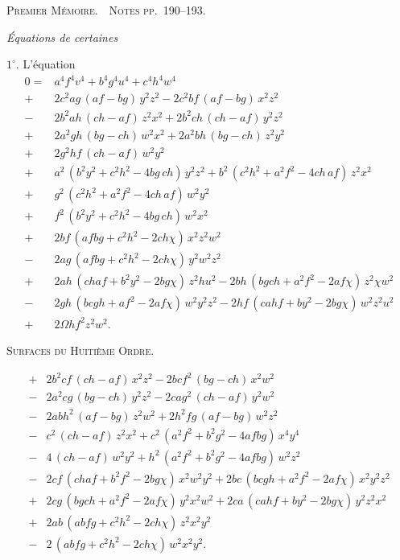 \documentclass[11pt,a4paper]{article}
\theoremstyle{plain}
\theoremstyle{definition}
\begin{document}
\begin{center}
\textsc{Premier M\'emoire.\ \ Notes pp.~190--193.}
\end{center}

\medskip\noindent
\textit{\'Equations de certaines}
\medskip

$1^\circ$.  L'\'equation
\begin{align*}
0 = {}& a^4 f^4 v^4 + b^4 g^4 u^4 + c^4 h^4 w^4 \\
{}+{}& 2c^2 ag\,(af - bg)\,y^2 z^2 - 2c^2 bf\,(af - bg)\,x^2 z^2 \\
{}-{}& 2b^2 ah\,(ch - af)\,z^2 x^2 + 2b^2 ch\,(ch - af)\,y^2 z^2 \\
{}+{}& 2a^2 gh\,(bg - ch)\,w^2 x^2 + 2a^2 bh\,(bg - ch)\,z^2 y^2 \\
{}+{}& 2g^2 hf\,(ch - af)\,w^2 y^2 \\
{}+{}& a^2\,(b^2 y^2 + c^2 h^2 - 4bg\,ch)\,y^2 z^2
       + b^2\,(c^2 h^2 + a^2 f^2 - 4ch\,af)\,z^2 x^2 \\
{}+{}& g^2\,(c^2 h^2 + a^2 f^2 - 4ch\,af)\,w^2 y^2 \\
{}+{}& f^2\,(b^2 y^2 + c^2 h^2 - 4bg\,ch)\,w^2 x^2 \\
{}+{}& 2bf\,(af bg + c^2 h^2 - 2ch\chi)\,x^2 z^2 w^2 \\
{}-{}& 2ag\,(af bg + c^2 h^2 - 2ch\chi)\,y^2 w^2 z^2 \\
{}+{}& 2ah\,(ch af + b^2 y^2 - 2bg\chi)\,z^2 h u^2
       - 2bh\,(bg ch + a^2 f^2 - 2af\chi)\,z^2 \chi w^2 \\
{}-{}& 2gh\,(bc gh + af^2 - 2af\chi)\,w^2 y^2 z^2
       - 2hf\,(c a hf + b y^2 - 2bg\chi)\,w^2 z^2 u^2 \\
{}+{}& 2\Omega h f^2 z^2 w^2.
\end{align*}

\medskip\noindent
\textsc{Surfaces du Huiti\`eme Ordre.}
\medskip

\begin{align*}
{}+{}& 2b^2 cf\,(ch - af)\,x^2 z^2 - 2bc f^2\,(bg - ch)\,x^2 w^2 \\
{}-{}& 2a^2 cg\,(bg - ch)\,y^2 z^2 - 2c a g^2\,(ch - af)\,y^2 w^2 \\
{}-{}& 2abh^2\,(af - bg)\,z^2 w^2 + 2h^2 f g\,(af - bg)\,w^2 z^2 \\
{}-{}& c^2\,(ch - af)\,z^2 x^2 + c^2\,(a^2 f^2 + b^2 g^2 - 4af bg)\,x^4 y^4 \\
{}-{}& 4\,(ch - af)\,w^2 y^2 + h^2\,(a^2 f^2 + b^2 g^2 - 4af bg)\,w^2 z^2 \\
{}-{}& 2cf\,(ch af + b^2 f^2 - 2bg\chi)\,x^2 w^2 y^2 + 2bc\,(bc gh + a^2 f^2 - 2af\chi)\,x^2 y^2 z^2 \\
{}+{}& 2cg\,(bg ch + a^2 f^2 - 2af\chi)\,y^2 x^2 w^2 + 2ca\,(ca hf + by^2 - 2bg\chi)\,y^2 z^2 x^2 \\
{}+{}& 2ab\,(ab fg + c^2 h^2 - 2ch\chi)\,z^2 x^2 y^2 \\
{}-{}& 2\,(ab fg + c^2 h^2 - 2ch\chi)\,w^2 x^2 y^2.
\end{align*}
\end{document}
